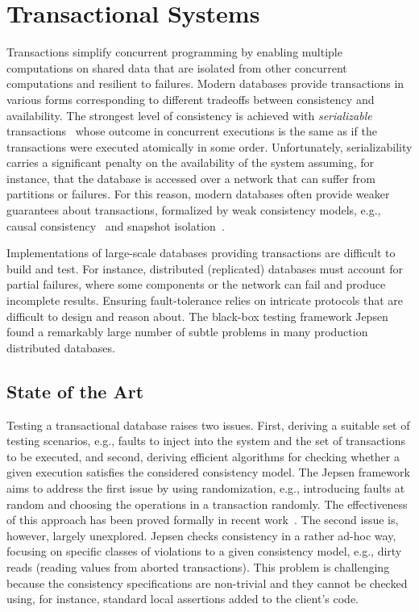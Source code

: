 
\section{Transactional Systems}

Transactions simplify concurrent programming by enabling multiple computations on shared data that are isolated from other concurrent computations and resilient to failures. Modern databases provide transactions in various forms corresponding to different tradeoffs between consistency and availability. The strongest level of consistency is achieved with \emph{serializable} transactions~\cite{DBLP:journals/jacm/Papadimitriou79b} whose outcome in concurrent executions is the same as if the transactions were executed atomically in some order. Unfortunately, serializability carries a significant penalty on the availability of the system assuming, for instance, that the database is accessed over a network that can suffer from partitions or failures. For this reason, modern databases often provide weaker guarantees about transactions, formalized by weak consistency models, e.g., causal consistency~\cite{DBLP:journals/cacm/Lamport78} and snapshot isolation~\cite{DBLP:conf/sigmod/BerensonBGMOO95}.

Implementations of large-scale databases providing transactions are difficult to build and test. For instance, distributed (replicated) databases must account for partial failures, where some components or the network can fail and produce incomplete results. Ensuring fault-tolerance relies on intricate protocols that are difficult to design and reason about. The black-box testing framework Jepsen~\cite{jepsen} found a remarkably large number of subtle problems in many production distributed databases. %

\subsection{State of the Art}

Testing a transactional database raises two issues. First, deriving a suitable set of testing scenarios, e.g., faults to inject into the system and the set of transactions to be executed, and second, deriving efficient algorithms for checking whether a given execution satisfies the considered consistency model. The Jepsen framework aims to address the first issue by using randomization, 
e.g., introducing faults at random and choosing the operations in a transaction randomly. The effectiveness of this approach has been proved formally in recent work~\cite{DBLP:journals/pacmpl/OzkanMNBW18}. The second issue is, however, largely unexplored. Jepsen checks consistency in a rather ad-hoc way, focusing on specific classes of violations to a given consistency model, e.g., dirty reads (reading values from aborted transactions). This problem is challenging because the consistency specifications are non-trivial and they cannot be checked using, for instance, standard local assertions added to the client's code. 

